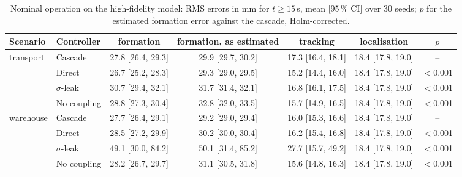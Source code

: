\begin{table}[htbp]\centering\small
\caption{Nominal operation on the high-fidelity model: RMS errors in mm for $t\ge15$\,s, mean [95\,\% CI] over 30 seeds; $p$ for the estimated formation error against the cascade, Holm-corrected.}\label{tab:r2_nominal}
\begin{adjustbox}{max width=\linewidth}
\begin{tabular}{@{}llccccc@{}}\toprule
Scenario & Controller & formation & formation, as estimated & tracking & localisation & $p$\\\midrule
transport & Cascade & 27.8 [26.4, 29.3] & 29.9 [29.7, 30.2] & 17.3 [16.4, 18.1] & 18.4 [17.8, 19.0] & --\\
 & Direct & 26.7 [25.2, 28.3] & 29.3 [29.0, 29.5] & 15.2 [14.4, 16.0] & 18.4 [17.8, 19.0] & $<$0.001\\
 & $\sigma$-leak & 30.7 [29.4, 32.1] & 31.7 [31.4, 32.1] & 16.8 [16.1, 17.5] & 18.4 [17.8, 19.0] & $<$0.001\\
 & No coupling & 28.8 [27.3, 30.4] & 32.8 [32.0, 33.5] & 15.7 [14.9, 16.5] & 18.4 [17.8, 19.0] & $<$0.001\\
\addlinespace
warehouse & Cascade & 27.7 [26.4, 29.1] & 29.2 [29.0, 29.4] & 16.0 [15.3, 16.6] & 18.4 [17.8, 19.0] & --\\
 & Direct & 28.5 [27.2, 29.9] & 30.2 [30.0, 30.4] & 16.2 [15.4, 16.8] & 18.4 [17.8, 19.0] & $<$0.001\\
 & $\sigma$-leak & 49.1 [30.0, 84.2] & 50.1 [31.4, 85.2] & 27.7 [15.7, 49.2] & 18.4 [17.8, 19.0] & $<$0.001\\
 & No coupling & 28.2 [26.7, 29.7] & 31.1 [30.5, 31.8] & 15.6 [14.8, 16.3] & 18.4 [17.8, 19.0] & $<$0.001\\
\bottomrule\end{tabular}
\end{adjustbox}
\end{table}
